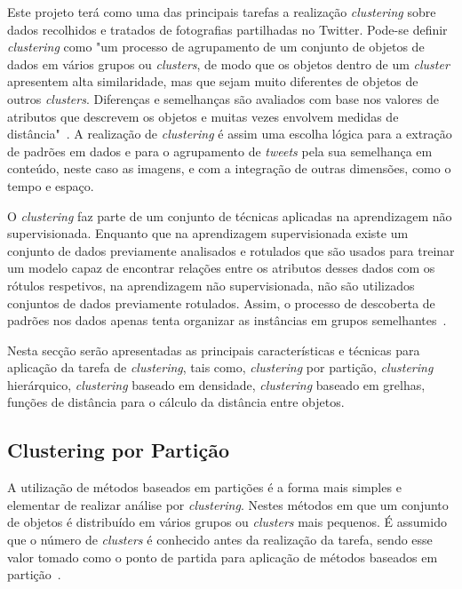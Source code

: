Este projeto terá como uma das principais tarefas a realização \textit{clustering} sobre dados recolhidos e tratados de fotografias partilhadas no Twitter. Pode-se definir \textit{clustering} como "um processo de agrupamento de um conjunto de objetos de dados em vários grupos ou \textit{clusters}, de modo que os objetos dentro de um \textit{cluster} apresentem alta similaridade, mas que sejam muito diferentes de objetos de outros \textit{clusters}. Diferenças e semelhanças são avaliados com base nos valores de atributos que descrevem os objetos e muitas vezes envolvem medidas de distância"~\citet{Han2006}. A realização de \textit{clustering} é assim uma escolha lógica para a extração de padrões em dados e para o agrupamento de \textit{tweets} pela sua semelhança em conteúdo, neste caso as imagens, e com a integração de outras dimensões, como o tempo e espaço.

O \textit{clustering} faz parte de um conjunto de técnicas aplicadas na aprendizagem não supervisionada. Enquanto que na aprendizagem supervisionada existe um conjunto de dados previamente analisados e rotulados que são usados para treinar um modelo capaz de encontrar relações entre os atributos desses dados com os rótulos respetivos, na aprendizagem não supervisionada, não são utilizados conjuntos de dados previamente rotulados. Assim, o processo de descoberta de padrões nos dados apenas tenta organizar as instâncias em grupos semelhantes~\citet{Liu2011}.

Nesta secção serão apresentadas as principais características e técnicas para aplicação da tarefa de \textit{clustering}, tais como, \textit{clustering} por partição, \textit{clustering} hierárquico, \textit{clustering} baseado em densidade, \textit{clustering} baseado em grelhas, funções de distância para o cálculo da distância entre objetos.


\subsection{Clustering por Partição} \label{subsec:parti}

A utilização de métodos baseados em partições é a forma mais simples e elementar de realizar análise por \textit{clustering}. Nestes métodos em que um conjunto de objetos é distribuído em vários grupos ou \textit{clusters} mais pequenos. É assumido que o número de \textit{clusters} é conhecido antes da realização da tarefa, sendo esse valor tomado como o ponto de partida para aplicação de métodos baseados em partição~\citet{Han2006}. 

